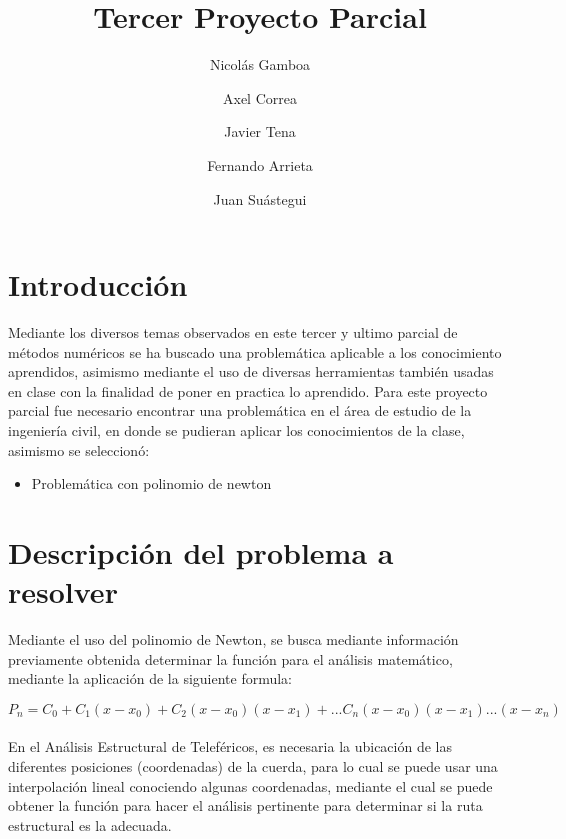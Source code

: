\documentclass[fleqn,10pt]{olplainarticle}
\title{Tercer Proyecto Parcial}
\author[1]{Nicolás Gamboa}
\author[2]{Axel Correa}
\author[3]{Javier Tena}
\author[4]{Fernando Arrieta}
\author[5]{Juan Suástegui}
\affil[1]{A01636262}
\affil[2]{A01636607}
\affil[3]{A01067470}
\affil[4]{A01336257}
\affil[5]{A01066742}
\begin{document}
\flushbottom
\maketitle
\thispagestyle{empty}

\section*{Introducción}

Mediante los diversos temas observados en este tercer y ultimo parcial de métodos numéricos se ha buscado una problemática aplicable a los conocimiento aprendidos, asimismo mediante el uso de diversas herramientas también usadas en clase con la finalidad de poner en practica lo aprendido.
Para este proyecto parcial fue necesario encontrar una problemática en el área de estudio de la ingeniería civil, en donde se pudieran aplicar los conocimientos de la clase, asimismo se seleccionó: 
 \begin{itemize}
      \item Problemática con polinomio de newton
\end{itemize}

\section*{Descripción del problema a resolver}

Mediante el uso del polinomio de Newton, se busca mediante información previamente obtenida determinar la función para el análisis matemático, mediante la aplicación de la siguiente formula:

\[ P_n=C_0 + C_1(x-x_0)+C_2(x-x_0)(x-x_1)+...C_n(x-x_0)(x-x_1)...(x-x_n)\]
\\
En el Análisis Estructural de Teleféricos, es necesaria la ubicación de las diferentes posiciones (coordenadas) de la cuerda, para lo cual se puede usar una interpolación lineal conociendo algunas coordenadas, mediante el cual se puede obtener la función para hacer el análisis pertinente para determinar si la ruta estructural es la adecuada. 
\end{document}
